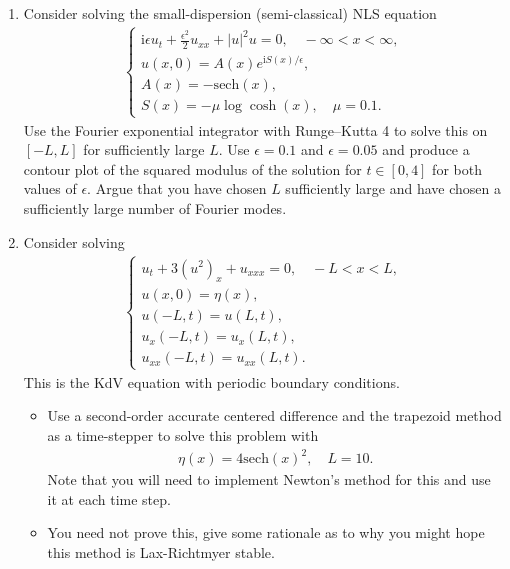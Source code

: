 \documentclass[10pt]{amsart}
\newcommand{\I}{\text{i}}
\begin{document}
\begin{enumerate}[label={\bf Problem~{\arabic*}:}]
    \item Consider solving the small-dispersion (semi-classical) NLS equation
  \begin{align*}
    \begin{cases}
      \I \epsilon u_t + \frac{\epsilon^2}{2} u_{xx} + |u|^2 u = 0, \quad -\infty < x < \infty,\\
      u(x,0) = A(x) e^{\I S(x)/\epsilon},\\
      A(x) = - \mathrm{sech}(x),\\
      S(x) = - \mu \log \cosh (x), \quad \mu = 0.1.
    \end{cases}
    \end{align*}
        Use the Fourier exponential integrator with Runge--Kutta 4 to solve this on $[-L, L]$ for sufficiently large $L$.  Use $\epsilon = 0.1$ and $\epsilon = 0.05$ and produce a contour plot of the squared modulus of the solution for $t \in [0,4]$ for both values of $\epsilon$.  Argue that you have chosen $L$ sufficiently large and have chosen a sufficiently large number of Fourier modes.

        \mline 

\item Consider solving
  \begin{align*}
    \begin{cases} u_t + 3 (u^2)_x + u_{xxx} = 0, \quad -L < x < L,\\
      u(x,0) = \eta(x),\\
      u(-L,t) = u(L,t),\\
      u_x(-L,t) = u_x(L,t),\\
      u_{xx}(-L,t) = u_{xx}(L,t).\end{cases}
    \end{align*}
    This is the KdV equation with periodic boundary conditions.
    \begin{itemize}
    \item Use a second-order accurate centered difference and the trapezoid method as a time-stepper to solve this problem with
      \begin{align*}
        \eta(x) = 4 \mathrm{sech}(x)^2, \quad L = 10.
      \end{align*}
      Note that you will need to implement Newton's method for this and use it at each time step.
    \item You need not prove this, give some rationale as to why you might hope this method is Lax-Richtmyer stable.  
    \end{itemize}
    \mline


\end{enumerate}
\end{document}
